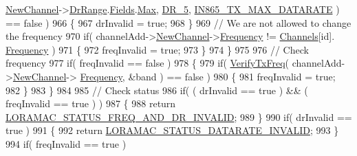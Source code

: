 \begin{DoxyCode}
      \mbox{\hyperlink{structs_channel_add_params_afc31493a105479490228fd896b20b45c}{NewChannel}}->\mbox{\hyperlink{structs_channel_params_ad4d9b041ea740886a05fa8a1d06997a2}{DrRange}}.\mbox{\hyperlink{unionu_dr_range_a5bdb9afc17112f2ae5f9548f0aee964f}{Fields}}.\mbox{\hyperlink{structu_dr_range_1_1s_fields_a5d03c6d792ca60d11ffc7e7a2cb59dd0}{Max}}, \mbox{\hyperlink{group___r_e_g_i_o_n_ga872e12c82020c02a7f70a1c6ed1375df}{DR\_5}}, 
      \mbox{\hyperlink{group___r_e_g_i_o_n_i_n865_ga927945116c9bf6917614b894d45c0972}{IN865\_TX\_MAX\_DATARATE}} ) == \textcolor{keyword}{false} )
966         \{
967             drInvalid = \textcolor{keyword}{true};
968         \}
969         \textcolor{comment}{// We are not allowed to change the frequency}
970         \textcolor{keywordflow}{if}( channelAdd->\mbox{\hyperlink{structs_channel_add_params_afc31493a105479490228fd896b20b45c}{NewChannel}}->\mbox{\hyperlink{structs_channel_params_ade3d190636488dad9a89b19446b7acf1}{Frequency}} != \mbox{\hyperlink{_region_i_n865_8c_adad6dcb99199b5142166021a8aac9aa2}{Channels}}[\textcolor{keywordtype}{id}].
      \mbox{\hyperlink{structs_channel_params_ade3d190636488dad9a89b19446b7acf1}{Frequency}} )
971         \{
972             freqInvalid = \textcolor{keyword}{true};
973         \}
974     \}
975 
976     \textcolor{comment}{// Check frequency}
977     \textcolor{keywordflow}{if}( freqInvalid == \textcolor{keyword}{false} )
978     \{
979         \textcolor{keywordflow}{if}( \mbox{\hyperlink{_region_i_n865_8c_a827497ee67461abdb257e1ff3f7e78e6}{VerifyTxFreq}}( channelAdd->\mbox{\hyperlink{structs_channel_add_params_afc31493a105479490228fd896b20b45c}{NewChannel}}->
      \mbox{\hyperlink{structs_channel_params_ade3d190636488dad9a89b19446b7acf1}{Frequency}}, &band ) == \textcolor{keyword}{false} )
980         \{
981             freqInvalid = \textcolor{keyword}{true};
982         \}
983     \}
984 
985     \textcolor{comment}{// Check status}
986     \textcolor{keywordflow}{if}( ( drInvalid == \textcolor{keyword}{true} ) && ( freqInvalid == \textcolor{keyword}{true} ) )
987     \{
988         \textcolor{keywordflow}{return} \mbox{\hyperlink{group___l_o_r_a_m_a_c_gga1d18f26b344040b3ec5c3db662919661a163a1a739baee13607068af42f2e9d30}{LORAMAC\_STATUS\_FREQ\_AND\_DR\_INVALID}};
989     \}
990     \textcolor{keywordflow}{if}( drInvalid == \textcolor{keyword}{true} )
991     \{
992         \textcolor{keywordflow}{return} \mbox{\hyperlink{group___l_o_r_a_m_a_c_gga1d18f26b344040b3ec5c3db662919661aa910e51ef7a7cf64c27dd3ffe5eb9d38}{LORAMAC\_STATUS\_DATARATE\_INVALID}};
993     \}
994     \textcolor{keywordflow}{if}( freqInvalid == \textcolor{keyword}{true} )

\end{DoxyCode}
